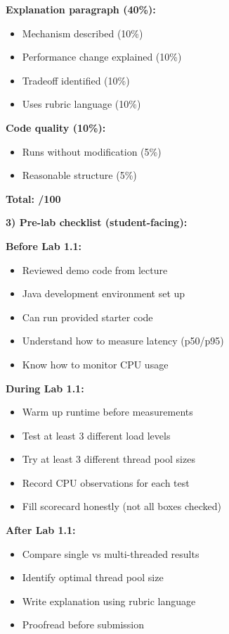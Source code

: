 \documentclass[11pt,a4paper]{article}
\begin{document}
\textbf{Explanation paragraph (40\%):}
\begin{itemize}[leftmargin=*]
\item[$\square$] Mechanism described (10\%)
\item[$\square$] Performance change explained (10\%)
\item[$\square$] Tradeoff identified (10\%)
\item[$\square$] Uses rubric language (10\%)
\end{itemize}

\textbf{Code quality (10\%):}
\begin{itemize}[leftmargin=*]
\item[$\square$] Runs without modification (5\%)
\item[$\square$] Reasonable structure (5\%)
\end{itemize}

\textbf{Total: /100}

\vspace{1mm}
\textbf{3) Pre-lab checklist (student-facing):}

\textbf{Before Lab 1.1:}
\begin{itemize}[leftmargin=*]
\item[$\square$] Reviewed demo code from lecture
\item[$\square$] Java development environment set up
\item[$\square$] Can run provided starter code
\item[$\square$] Understand how to measure latency (p50/p95)
\item[$\square$] Know how to monitor CPU usage
\end{itemize}

\textbf{During Lab 1.1:}
\begin{itemize}[leftmargin=*]
\item[$\square$] Warm up runtime before measurements
\item[$\square$] Test at least 3 different load levels
\item[$\square$] Try at least 3 different thread pool sizes
\item[$\square$] Record CPU observations for each test
\item[$\square$] Fill scorecard honestly (not all boxes checked)
\end{itemize}

\textbf{After Lab 1.1:}
\begin{itemize}[leftmargin=*]
\item[$\square$] Compare single vs multi-threaded results
\item[$\square$] Identify optimal thread pool size
\item[$\square$] Write explanation using rubric language
\item[$\square$] Proofread before submission
\end{itemize}
\end{document}
